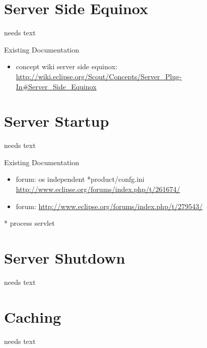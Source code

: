 \documentclass[a4paper,10pt,twoside]{book}
\begin{document}
\section{Server Side Equinox}
needs text

\noindent Existing Documentation
\begin{itemize}
  \item concept wiki server side equinox: \url{http://wiki.eclipse.org/Scout/Concepts/Server_Plug-In#Server_Side_Equinox}
\end{itemize}

\section{Server Startup}
needs text

\noindent Existing Documentation
\begin{itemize}
  \item forum: os independent *product/confg.ini \url{http://www.eclipse.org/forums/index.php/t/261674/}
  \item forum: \url{http://www.eclipse.org/forums/index.php/t/279543/}
\end{itemize}

  * process servlet

\section{Server Shutdown}
needs text


\begin{table}
\begin{center}
\caption{Numbers of distinct differentiable structures on real $n$-space
and $n$-spheres}
\label{diffstruc}
\end{center}
\end{table}

\section{Caching}
needs text



\ifx\wholebook\relax\else
   
   
\end{document}
